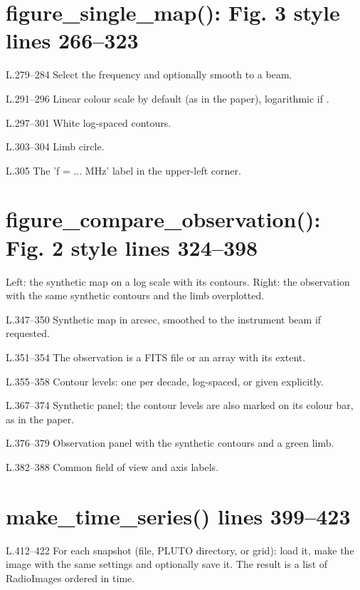 \section*{\normalsize figure\_single\_map(): Fig. 3 style \hfill{\small\mdseries\color{gray}lines 266--323}}

\begin{lines}
\item[L.279–284] Select the frequency and optionally smooth to a beam.
\item[L.291–296] Linear colour scale by default (as in the paper), logarithmic if .
\item[L.297–301] White log-spaced contours.
\item[L.303–304] Limb circle.
\item[L.305] The 'f = ... MHz' label in the upper-left corner.
\end{lines}
\section*{\normalsize figure\_compare\_observation(): Fig. 2 style \hfill{\small\mdseries\color{gray}lines 324--398}}

Left: the synthetic map on a log scale with its contours. Right: the observation with the same synthetic contours and the limb overplotted.

\begin{lines}
\item[L.347–350] Synthetic map in arcsec, smoothed to the instrument beam if requested.
\item[L.351–354] The observation is a FITS file or an array with its extent.
\item[L.355–358] Contour levels: one per decade, log-spaced, or given explicitly.
\item[L.367–374] Synthetic panel; the contour levels are also marked on its colour bar, as in the paper.
\item[L.376–379] Observation panel with the synthetic contours and a green limb.
\item[L.382–388] Common field of view and axis labels.
\end{lines}
\section*{\normalsize make\_time\_series() \hfill{\small\mdseries\color{gray}lines 399--423}}

\begin{lines}
\item[L.412–422] For each snapshot (file, PLUTO directory, or grid): load it, make the image with the same settings and optionally save it. The result is a list of RadioImages ordered in time.
\end{lines}
